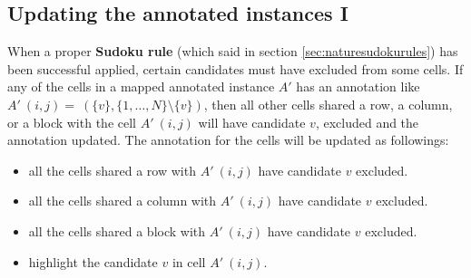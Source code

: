 \documentclass[11pt]{report}
\newcommand{\set}[1]{\{ #1 \}}
\begin{document}
\subsection{Updating the annotated instances I}
\label{sec:UpdatingtheinstancesI}

When a proper \textbf{Sudoku rule} (which said in section \ref{sec:naturesudokurules}) has been successful applied, certain candidates must have excluded from some cells. If any of the cells in a mapped annotated instance $A'$ has an annotation like $A'\ (i,j) =\ (\set{v}, \set{1,\dots,N} \setminus \set{v})$, then all other cells shared a row, a column, or a block with the cell $A'\ (i,j)$ will have candidate $v$, excluded and the annotation updated. The annotation for the cells will be updated as followings:
\begin{itemize}
\item all the cells shared a row with $A'\ (i,j)$ have candidate $v$ excluded.
\item all the cells shared a column with $A'\ (i,j)$ have candidate $v$ excluded.
\item all the cells shared a block with $A'\ (i,j)$ have candidate $v$ excluded.
\item highlight the candidate $v$ in cell $A'\ (i,j)$.
\end{itemize} 
\end{document}
